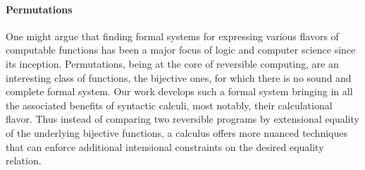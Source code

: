 \paragraph{Permutations} One might argue that finding formal systems for expressing various flavors of computable
functions has been a major focus of logic and computer science since its inception. Permutations, being at the core of
reversible computing, are an interesting class of functions, the bijective ones, for which there is no sound and
complete formal system. Our work develops such a formal system bringing in all the associated benefits of
syntactic calculi, most notably, their calculational flavor. Thus instead of comparing two reversible programs by
extensional equality of the underlying bijective functions, a calculus offers more nuanced techniques that can enforce
additional intensional constraints on the desired equality relation.





